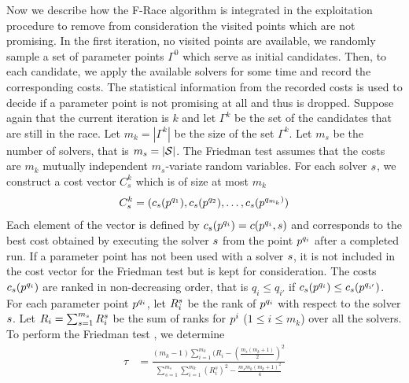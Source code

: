 Now we describe how the F-Race algorithm is integrated in the exploitation procedure to remove from consideration the visited points which are not promising. In the first iteration, no visited points are available, we randomly sample a set of parameter points $\Gamma^0$ which serve as initial candidates. Then, to each candidate, we apply the available solvers for some time and record the corresponding costs. The statistical information from the recorded costs is used to decide if a parameter point is not promising at all and thus is dropped. Suppose again that the current iteration is $k$ and let $\Gamma^k$ be the set of the candidates that are still in the race. Let $m_k = | \Gamma^k | $ be the size of the set $\Gamma^k$. Let $m_s$ be the number of solvers, that is $m_s = | \mathcal{S}|$. The Friedman test assumes that the costs are $m_k$ mutually independent $m_s$-variate random variables. For each solver $s$, we construct a cost vector $C^k_s$ which is of size at most $m_k$
\begin{eqnarray}\label{eq:C}
C^k_s = (c_{s}(p^{q_1}), c_{s}(p^{q_2}), \ldots, c_{s}(p^{q_{m_k})})
\end{eqnarray}
Each element of the vector is defined by $c_{s}(p^{q_i}) = c(p^{q_i}, s)$ and corresponds to the best cost obtained by executing the solver $s$ from the point $p^{q_i}$ after a completed run. If a parameter point has not been used with a solver $s$, it is not included in the cost vector for the Friedman test but is kept for consideration. The costs $c_{s}(p^{q_i})$ are ranked in non-decreasing order, that is $q_i \le q_{i'}$ if $c_{s}(p^{q_i}) \le c_{s}(p^{q_{i'}})$. For each parameter point $p^{q_i}$, let $R^{s}_{i}$ be the rank of $p^{q_i}$ with respect to the solver $s$. Let $R_{i} =  \sum_{s=1}^{m_s} R^{s}_{i}$ be the sum of ranks for $p^i$ ($1 \leq i \leq m_k$) over all the solvers. To perform the Friedman test \cite{GVK24551600X}, we determine
\begin{eqnarray*}
\displaystyle \tau & = \displaystyle{ \frac{ (m_k-1) \sum_{i=1}^{m_k} (R_i - (\frac{m_s(m_k+1)}{2})^2 } {\sum_{s=1}^{m_s} \sum_{i=1}^{m_k}  (R^s_{i})^2 -  \frac{m_s m_k (m_k+1)^2}{4} }}  \nonumber \\ 
\end{eqnarray*}
